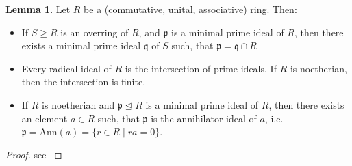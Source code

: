 \documentclass{article}
\def\p{\mathfrak{p}}
\def\q{\mathfrak{q}}
\newenvironment{bew}{\begin{proof}[Proof]}{\end{proof}}
\theoremstyle{definition}
\newtheorem{lem}[Satz]{Lemma}
\begin{document}
\begin{lem}\label{commalg}
Let $R$ be a (commutative, unital, associative) ring. Then:
\begin{itemize}
\item If $S \geq R$ is an overring of $R$, and $\p$ is a minimal prime ideal of $R$, then there exists a minimal prime ideal $\q$ of $S$ such, that $\p = \q \cap R$
\item Every radical ideal of $R$ is the intersection of prime ideals. If $R$ is noetherian, then the intersection is finite.
\item If $R$ is noetherian and $\p \unlhd R$ is a minimal prime ideal of $R$, then there exists an element $a \in R$ such, that $\p$ is the annihilator ideal of $a$, i.e. $\p = \text{Ann}(a) = \{ r \in R \mid ra = 0 \}$.
\end{itemize}
\begin{bew}
see \cite{wiebmer} %
\end{bew}
\end{lem}
\end{document}
